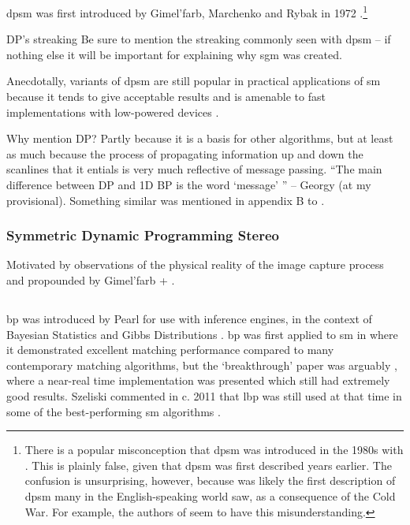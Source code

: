 \gls{dpsm} was first introduced by Gimel'farb, Marchenko and Rybak in 1972 \cite{Gimelfarb1972}.\footnote{There is a popular misconception that \gls{dpsm} was introduced in the 1980s with \cite{Ohta1985}.  This is plainly false, given that \gls{dpsm} was first described years earlier.  The confusion is unsurprising, however, because \cite{Ohta1985} was likely the first description of \gls{dpsm} many in the English-speaking world saw, as a consequence of the Cold War.  For example, the authors \cite{Salmen2009} of seem to have this misunderstanding.}  

\begin{anfxnote}{DP's streaking}
    Be sure to mention the streaking commonly seen with \gls{dpsm} -- if nothing else it will be important for explaining why \gls{sgm} was created.
\end{anfxnote}

Anecdotally, variants of \gls{dpsm} are still popular in practical applications of \gls{sm} because it tends to give acceptable results \fxerror[inline]{[ref?]} and is amenable to fast implementations with low-powered devices \fxerror[inline]{[ref?]}.

\begin{anfxnote}{Why mention DP?}
    Partly because it is a basis for other algorithms, but at least as much because the process of propagating information up and down the scanlines that it entials is very much reflective of message passing.  ``The main difference between DP and 1D BP is the word `message' '' -- Georgy (at my provisional).  Something similar was mentioned in appendix B to \cite{Szeliski2011}.
\end{anfxnote}

\subsubsection{Symmetric Dynamic Programming Stereo}
Motivated by observations of the physical reality of the image capture process and propounded by Gimel'farb \cite{Gimelfarb1979,Gimelfarb2001} + \cite{Nguyen2013,VanMeerbergen2001}.  \cite{Khan2016}

\subsection{}
\gls{bp} was introduced by Pearl \cite{Pearl1982} for use with inference engines, in the context of Bayesian Statistics \fxerror[inline]{[ref]} and Gibbs Distributions \fxerror[inline]{[ref]}.  \gls{bp} was first applied to \gls{sm} in \cite{Sun2003} where it demonstrated excellent matching performance compared to many contemporary matching algorithms, but the `breakthrough' paper was arguably \cite{Felzenszwalb2006}, where a near-real time implementation was presented which still had extremely good results.  Szeliski commented in c. 2011 that \gls{lbp} was still used at that time in some of the best-performing \gls{sm} algorithms \cite[p. 163]{Szeliski2011}.

